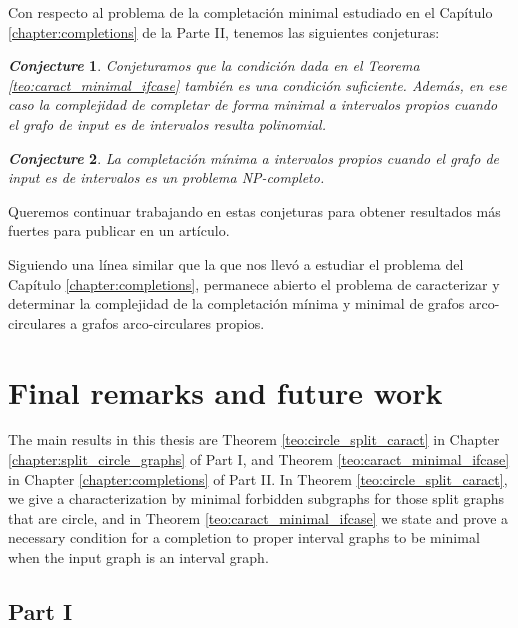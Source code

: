 \documentclass[12pt]{book}
\theoremstyle{plain}
\newtheorem{conj}{\textit{Conjecture}}[chapter]
\theoremstyle{remark}
\begin{document}
Con respecto al problema de la completación minimal estudiado en el Capítulo \ref{chapter:completions} de la Parte II, tenemos las siguientes conjeturas:

\begin{conj}
	Conjeturamos que la condición dada en el Teorema \ref{teo:caract_minimal_ifcase} también es una condición suficiente. Además, en ese caso la complejidad de completar de forma minimal a intervalos propios cuando el grafo de input es de intervalos resulta polinomial. 
\end{conj}

\begin{conj}
La completación mínima a intervalos propios cuando el grafo de input es de intervalos es un problema NP-completo.
\end{conj}

Queremos continuar trabajando en estas conjeturas para obtener resultados más fuertes para publicar en un artículo.  

Siguiendo una línea similar que la que nos llevó a estudiar el problema del Capítulo \ref{chapter:completions}, permanece abierto el problema de caracterizar y determinar la complejidad de la completación mínima y minimal de grafos arco-circulares a grafos arco-circulares propios.


%
\chapter*{Final remarks and future work}

The main results in this thesis are Theorem \ref{teo:circle_split_caract} in Chapter \ref{chapter:split_circle_graphs} of Part I, and Theorem \ref{teo:caract_minimal_ifcase} in Chapter \ref{chapter:completions} of Part II. In Theorem \ref{teo:circle_split_caract}, we give a characterization by minimal forbidden subgraphs for those split graphs that are circle, and in Theorem \ref{teo:caract_minimal_ifcase} we state and prove a necessary condition for a completion to proper interval graphs to be minimal when the input graph is an interval graph.

\section*{Part I}
\end{document}
